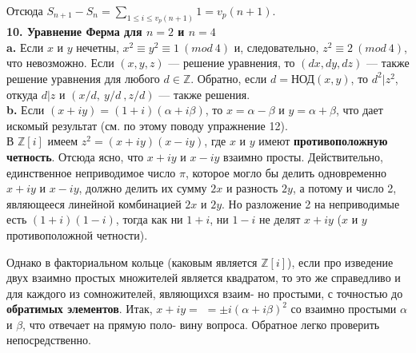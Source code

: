 \documentclass{mai_book}
\begin{document}
Отсюда $S_{n+1}-S_n=\sum_{1\leqslant i\leqslant v_p(n+1)}1=v_p(n+1)$.\newline
\\
\noindent\textbf{10. Уравнение Ферма для $n=2$ и $n=4$} \newline 
\\
\hspace*{15pt}\textbf{a.} Если $x$ и $y$ нечетны,\:\: $x^2\equiv y^2\equiv 1~(mod~4)$\:\: и, следовательно,\linebreak
$z^2\equiv 2~(mod~4)$, что невозможно. Если $(x,y,z)$ — решение уравнения,\linebreak
то $(dx,dy,dz)$ — также решение уравнения для любого $d\in \mathbb{Z}$. Обратно,\linebreak
если $d=\text{НОД}(x,y)$, то $d^2|z^2$, откуда $d|z$ и $(x/d,~y/d~,z/d)$ — также\linebreak
решения.\newline
\\
\hspace*{15pt}\textbf{b.} Если $(x+iy)=(1+i)(\alpha+i\beta)$, то $x=\alpha-\beta$ и $y=\alpha+\beta$, что дает\linebreak
искомый результат (см. по этому поводу упражнение 12).\\

В $\mathbb{Z}[i]$ имеем $z^2=(x+iy)(x-iy)$, где $x$ и $y$ имеют \textbf{противоположную}\linebreak
\textbf{четность}. Отсюда ясно, что $x+iy$ и $x-iy$ взаимно просты.\linebreak
Действительно, единственное неприводимое число $\pi$, которое мог­ло бы\linebreak
делить одновременно $x+iy$ и $x-iy$, должно делить их сумму $2x$\linebreak
%
%
\noindent и разность $2y$, а потому и число 2, являющееся линейной комбинацией\linebreak
$2x$ и $2y$. Но разложение 2 на неприводимые есть $(1+i)(1-i)$, тогда как\linebreak 
ни $1+i$, ни $1-i$ не делят $x+iy$ ($x$ и $y$ противоположной четности).

Однако в факториальном кольце (каковым является $\mathbb{Z}[i]$), если про\linebreak
изведение двух взаимно простых множителей является квадратом, то\linebreak
это же справедливо и для каждого из сомножителей, являющихся взаим-\linebreak
но простыми, с точностью до \textbf{обратимых элементов}. Итак, $x+iy=$\linebreak
$=\pm i(\alpha+i\beta)^2$ со взаимно простыми $\alpha$ и $\beta$, что отвечает на прямую поло-\linebreak
вину вопроса. Обратное легко проверить непосредственно.
\end{document}
